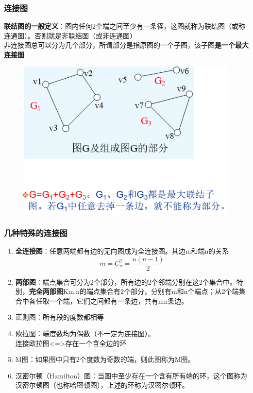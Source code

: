 \subsubsection{连接图}
\textbf{联结图的一般定义}：图内任何2个端之间至少有一条径，这图就称为联结图（或称连通图）。否则就是非联结图（或非连通图）\\
非连接图总可以分为几个部分，所谓部分是指原图的一个子图，该子图\textbf{是一个最大连接图}
\begin{figure}[H]
	\centering
	\includegraphics[width=0.7\linewidth]{screenshot003}
	\caption{}
	\label{fig:screenshot003}
\end{figure}
\subsubsection{几种特殊的连接图}
\begin{enumerate}
	\item \textbf{全连接图}：任意两端都有边的无向图成为全连接图。其边m和端n的关系
	\begin{equation}\label{key}
	m = C_n^2 = \frac{n(n-1)}{2}
	\end{equation}
	\item \textbf{两部图}：端点集合可分为2个部分，所有边的2个邻端分别在这2个集合中。特别，\textbf{完全两部图}Km,n的端点集合有2个部分，分别有m和n个端点；从2个端集合中各任取一个端，它们之间都有一条边，共有mn条边。
	\item 正则图：所有段的度数都相等
	\item 欧拉图：端度数均为偶数（不一定为连接图）。\\
连接欧拉图<=>存在一个含全边的环		
	\item M图：如果图中只有2个度数为奇数的端，则此图称为M图。
	\item 汉密尔顿（Hamilton）图：当图中至少存在一个含有所有端的环，这个图称为汉密尔顿图（也称哈密顿图），上述的环称为汉密尔顿环。
\end{enumerate}

